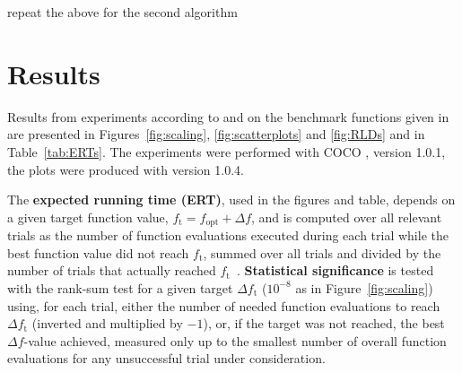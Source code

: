 \documentclass{sig-alternate}
\newcommand{\Df}{\ensuremath{\Delta f}}
\newcommand{\fopt}{\ensuremath{f_\mathrm{opt}}}
\newcommand{\ftarget}{\ensuremath{f_\mathrm{t}}}
\newcommand{\change}[1]{{\color{red} #1}}
\begin{document}
\change{repeat the above for the second algorithm}

\section{Results}

Results from experiments according to \cite{hansen2016exp} and \cite{hansen2016perfass} on the benchmark
functions given in \cite{wp200901_2010,hansen2012fun} are presented in
Figures~\ref{fig:scaling}, \ref{fig:scatterplots} and \ref{fig:RLDs} and
in Table~\ref{tab:ERTs}. The experiments were performed with COCO \cite{hansen2016cocoplat},
version \change{1.0.1}, the plots were produced with version \change{1.0.4}.

The \textbf{expected running time (ERT)}, used in the figures and table, depends on a
given target function value, $\ftarget=\fopt+\Df$, and is computed over all relevant trials
as the number of function evaluations executed during each trial while the best
function value did not reach \ftarget, summed over all trials
and divided by the number of trials that actually reached \ftarget\
\cite{hansen2012exp,price1997dev}. 
\textbf{Statistical significance} is tested with the rank-sum test for a given
target $\Delta\ftarget$ ($10^{-8}$ as in Figure~\ref{fig:scaling}) using,
for each trial, either the number of needed function evaluations to reach
$\Delta\ftarget$ (inverted and multiplied by $-1$), or, if the target was not
reached, the best $\Df$-value achieved, measured only up to the smallest number
of overall function evaluations for any unsuccessful trial under consideration.



\end{document}
